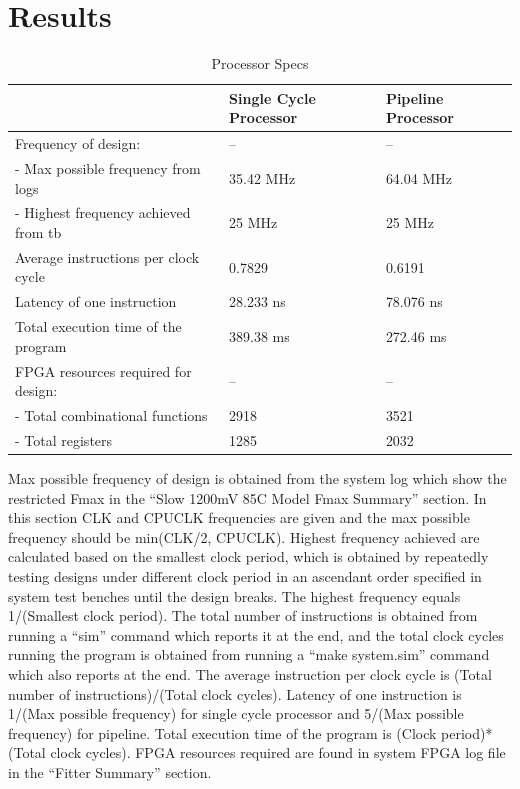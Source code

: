 \documentclass[12pt]{article}
\begin{document}
  \newpage
  \section{Results}

  \begin{table}[!hbp]

    \begin{tabular}{|p{}|p{}|p{}|}
      \hline
       & Single Cycle Processor & Pipeline Processor \\ \hline
      Frequency of design: & -- & -- \\ \hline
      - Max possible frequency from logs & 35.42 MHz & 64.04 MHz \\ \hline
      - Highest frequency achieved from tb & 25 MHz & 25 MHz \\ \hline
      Average instructions per clock cycle & 0.7829 & 0.6191 \\ \hline
      Latency of one instruction & 28.233 ns & 78.076 ns \\ \hline
      Total execution time of the program & 389.38 ms & 272.46 ms \\ \hline
      FPGA resources required for design: & -- & -- \\ \hline
      - Total combinational functions & 2918 & 3521 \\ \hline
      - Total registers & 1285 & 2032 \\ \hline
    \end{tabular}

    \caption{Processor Specs}
		\label{tb:procspec}
  \end{table}
  Max possible frequency of design is obtained from the system log which show the restricted Fmax in the ``Slow 1200mV 85C Model Fmax Summary'' section. In this section CLK and CPUCLK frequencies are given and the max possible frequency should be min(CLK/2, CPUCLK). Highest frequency achieved are calculated based on the smallest clock period, which is obtained by repeatedly testing designs under different clock period in an ascendant order specified in system test benches until the design breaks. The highest frequency equals 1/(Smallest clock period). The total number of instructions is obtained from running a ``sim'' command which reports it at the end, and the total clock cycles running the program is obtained from running a ``make system.sim'' command which also reports at the end. The average instruction per clock cycle is (Total number of instructions)/(Total clock cycles). Latency of one instruction is 1/(Max possible frequency) for single cycle processor and 5/(Max possible frequency) for pipeline. Total execution time of the program is (Clock period)*(Total clock cycles). FPGA resources required are found in system FPGA log file in the “Fitter Summary” section.
\end{document}
